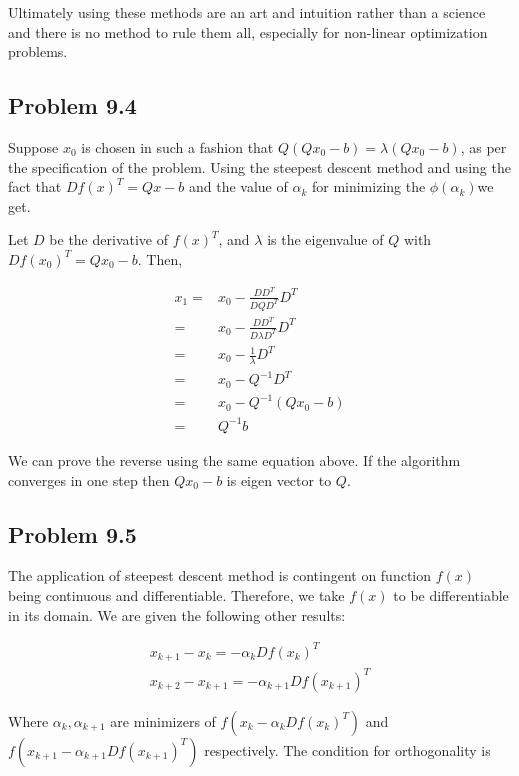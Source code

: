 \documentclass[letterpaper,12pt]{article}
\theoremstyle{definition}
\begin{document}
\begin{flushleft}
Ultimately using these methods are an art and intuition rather than a science and there is no method to rule them all, especially for non-linear optimization problems.
\end{flushleft}

\subsection*{Problem 9.4}
\begin{flushleft}
Suppose $x_0$ is chosen in such a fashion that $Q(Qx_0-b) = \lambda (Qx_0-b)$, as per the specification of the problem. Using the steepest descent method and using the fact that $Df(x)^T =  Qx-b$ and the value of $\alpha_k$ for minimizing the $\phi(\alpha_k)$we get.

\vspace{3mm}
Let $D$ be the derivative of $f(x)^T$, and $\lambda$ is the eigenvalue of $Q$ with $Df(x_0)^T = Q x_0 - b$. Then,
\end{flushleft}

\begin{align*}
  x_1 =& x_0 - \frac{D  D^T}{DQD^T} D^T \\
      =& x_0 - \frac{D D^T}{D \lambda D^T} D^T \\
      =& x_0 - \frac{1}{\lambda} D^T \\
      =& x_0 - Q^{-1} D^T \\
      =& x_0 - Q^{-1} (Q x_0 -b) \\
      =& Q^{-1}b
\end{align*}

We can prove the reverse using the same equation above. If the algorithm converges in one step then $Qx_0- b$ is eigen vector to $Q$.
\subsection*{Problem 9.5}
The application of steepest descent method is contingent on function $f(x)$ being continuous and differentiable. Therefore, we take $f(x)$ to be differentiable in its domain. We are given the following other results:

\begin{align*}
   x_{k+1} -x_k=  -\alpha_kDf(x_k)^T\\
   x_{k+2} -x_{k+1}=  -\alpha_{k+1}Df(x_{k+1})^T
\end{align*}

\begin{flushleft}
Where $\alpha_k,\alpha_{k+1} $ are minimizers of $f(x_k - \alpha_k  Df(x_k)^T )$ and $f(x_{k+1} - \alpha_{k+1} Df(x_{k+1})^T)$ respectively.
\vspace{2mm}
The condition for orthogonality is
\end{flushleft}
\end{document}

